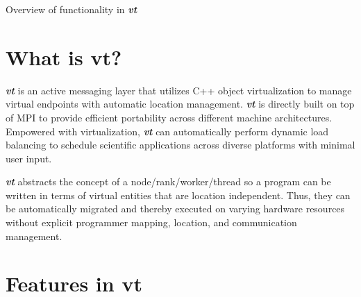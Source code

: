 Overview of functionality in {\bfseries {\itshape vt}}\hypertarget{introduction_what-is}{}\section{What is vt?}\label{introduction_what-is}
{\bfseries {\itshape vt}} is an active messaging layer that utilizes C++ object virtualization to manage virtual endpoints with automatic location management. {\bfseries {\itshape vt}} is directly built on top of M\+PI to provide efficient portability across different machine architectures. Empowered with virtualization, {\bfseries {\itshape vt}} can automatically perform dynamic load balancing to schedule scientific applications across diverse platforms with minimal user input.

{\bfseries {\itshape vt}} abstracts the concept of a {\ttfamily node}/{\ttfamily rank}/{\ttfamily worker}/{\ttfamily thread} so a program can be written in terms of virtual entities that are location independent. Thus, they can be automatically migrated and thereby executed on varying hardware resources without explicit programmer mapping, location, and communication management.\hypertarget{introduction_vt-features}{}\section{Features in vt}\label{introduction_vt-features}

